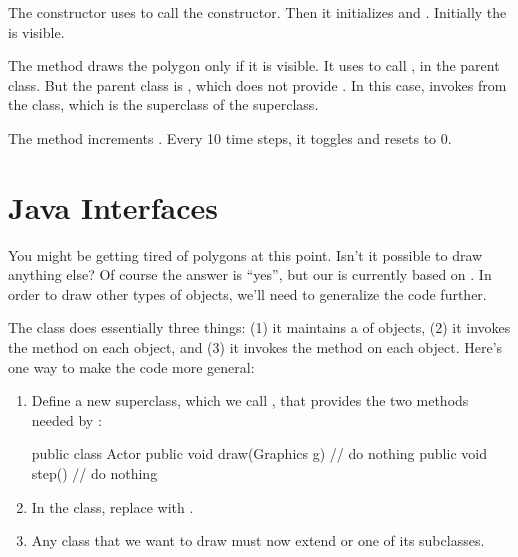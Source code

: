 The constructor uses  to call the  constructor.  Then it initializes  and .
Initially the  is visible.

The  method draws the polygon only if it is visible.
It uses  to call , in the parent class.
But the parent class is , which does not provide .
In this case,  invokes  from the  class, which is the superclass of the superclass.

The  method increments .  Every 10 time steps, it toggles  and resets  to 0.


\section{Java Interfaces}

You might be getting tired of polygons at this point.
Isn't it possible to draw anything else?
Of course the answer is ``yes'', but our  is currently based on .
In order to draw other types of objects, we'll need to generalize the code further.

The  class does essentially three things: (1) it maintains a  of objects, (2) it invokes the  method on each object, and (3) it invokes the  method on each object.
Here's one way to make the code more general:

\begin{enumerate}

\item Define a new superclass, which we call , that provides the two methods needed by :

\begin{code}
public class Actor {
    public void draw(Graphics g) {
        // do nothing
    }
    public void step() {
        // do nothing
    }
}
\end{code}

\item In the  class, replace  with .

\item Any class that we want to draw must now extend  or one of its subclasses.

\end{enumerate}

